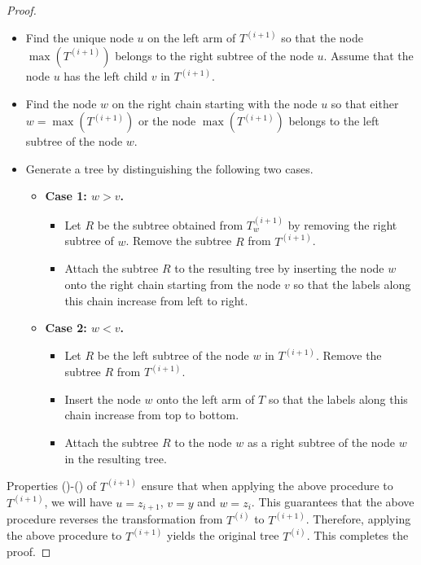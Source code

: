 \documentclass[10pt,a4paper]{amsart}
\newcommand{\rmnum}[1]{\romannumeral #1}
\begin{document}
\begin{proof}
   	 		\begin{itemize}
   	 			\item Find the unique node $u$ on the left arm of $T^{(i+1)}$ so that the node $\max(T^{(i+1)})$ belongs to the right subtree of the node $u$.   Assume that the node $u$ has the left child $v$ in $T^{(i+1)}$.
   	 			\item Find the node $w$ on the right chain starting with the node $u$ so that  either $w=\max(T^{(i+1)})$ or the node $\max(T^{(i+1)})$ belongs to the left subtree of the node $w$.  
   	 			\item Generate a tree by distinguishing the following two cases.
   	 			\begin{itemize}
   	 				\item {\bf Case 1: $w>v$. } 
   	 				\begin{itemize}
   	 					\item Let $R$ be the subtree obtained from $T^{(i+1)}_{w}$ by removing the  right subtree of $w$.
   	 		 Remove the subtree $R$ from $T^{(i+1)}$.
   	 					\item Attach the subtree $R$ to the resulting tree by  inserting the node $w$ onto the right chain starting from the node $v$ so that the labels along this chain increase from left to right.
   	 				\end{itemize}
   	 				
   	 				\item {\bf Case 2: $w<v$.}
   	 				\begin{itemize}
   	 					\item Let $R$ be the  left subtree of the node $w$ in $T^{(i+1)}$.
   	 				 Remove the subtree $R$ from $T^{(i+1)}$.
   	 					\item  Insert the node $w$ onto the left arm of $T$ so that the labels along this chain increase  from top to bottom.
   	 					\item Attach   the subtree $R$ to the node $w$ as a right subtree of the node $w$ in the resulting tree. 
   	 				\end{itemize}
   	 				
   	 			\end{itemize}
   	 		\end{itemize}
   	 		Properties (\rmnum{1})-(\rmnum{4}) of $T^{(i+1)}$ ensure that when applying the above procedure to $T^{(i+1)}$,  we will have $u=z_{i+1}$, $v=y$ and $w=z_i$.   This guarantees that the above procedure reverses the transformation from $T^{(i)}$ to $T^{(i+1)}$. Therefore, applying the above procedure to $T^{(i+1)}$ yields the original tree $T^{(i)}$. This completes the proof.  
   	 		\end{proof}
\end{document}
